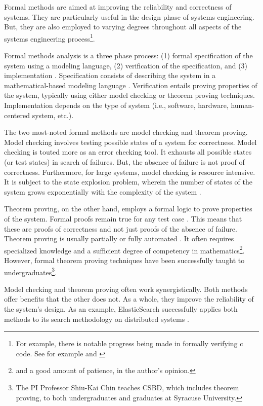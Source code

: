 \documentclass[../../main/main.tex]{subfiles}
\begin{document}
Formal methods are aimed at improving the reliability and correctness of systems\cite{formalmethodslcarke}.  They are particularly useful in the design phase of systems engineering.  But, they are also employed to varying degrees throughout all aspects of the systems engineering process\footnote{For example, there is notable progress being made in formally verifying c code.  See for example \cite{jvmcmv} and \cite{VARVEL}}.  

Formal methods analysis is a three phase process: (1) formal specification of the system using a modeling language, (2) verification of the specification, and (3) implementation \cite{formalCarnegie}.  Specification consists of describing the system in a mathematical-based modeling language \cite{formalCarnegie}.  Verification entails proving properties of the system, typically using either model checking or theorem proving techniques.  Implementation depends on the type of system (i.e., software, hardware, human-centered system, etc.).

The two most-noted formal methods are model checking and theorem proving.  Model checking involves testing possible states of a system for correctness.  Model checking is touted more as an error checking tool.  It exhausts all possible states (or test states) in search of failures.  But, the absence of failure is not proof of correctness.  Furthermore, for large systems, model checking is resource intensive.  It is subject to the state explosion problem, wherein the number of states of the system grows exponentially with the complexity of the system \cite{stateexplosion}. 

Theorem proving, on the other hand, employs a formal logic to prove properties of the system.  Formal proofs remain true for any test case \cite{formalCarnegie}.  This means that these are proofs of correctness and not just proofs of the absence of failure.  Theorem proving is usually partially or fully automated \cite{wikiformalmethods}.  It often requires specialized knowledge and a sufficient degree of competency in mathematics\footnote{and a good amount of patience, in the author's opinion.}. However, formal theorem proving techniques have been successfully taught to undergraduates\footnote{The PI Professor Shiu-Kai Chin teaches CSBD, which includes theorem proving, to both undergraduates and graduates at Syracuse University.}.  


Model checking and theorem proving often work synergistically.  Both methods offer benefits that the other does not.  As a whole, they improve the reliability of the system's design.   As an example, ElasticSearch successfully applies both methods to its search methodology on distributed systems \cite{elasticsearch}.  
\end{document}
